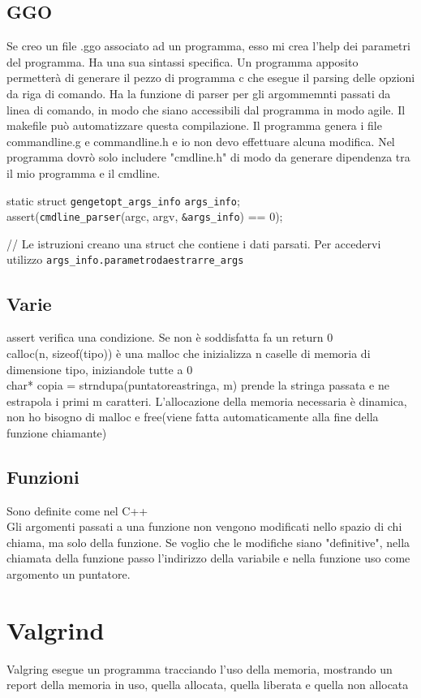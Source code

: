 \section{GGO}
Se creo un file .ggo associato ad un programma, esso mi crea l'help dei parametri del programma. Ha una sua sintassi specifica. Un programma apposito permetterà di generare il pezzo di programma c che esegue il parsing delle opzioni da riga di comando. Ha la funzione di parser per gli argommemnti passati da linea di comando, in modo che siano accessibili dal programma in modo agile.
Il makefile può automatizzare questa compilazione. Il programma genera i file commandline.g e commandline.h e io non devo effettuare alcuna modifica. Nel programma dovrò solo includere "cmdline.h" di modo da generare dipendenza tra il mio programma e il cmdline.

\begin{c}
static struct \verb|gengetopt_args_info| \verb|args_info|;\\
assert(\verb|cmdline_parser|(argc, argv, \verb|&args_info|) == 0);

// Le istruzioni creano una struct che contiene i dati parsati. Per accedervi utilizzo \verb|args_info.parametrodaestrarre_args|

\end{c}

\section{Varie}
assert verifica una condizione. Se non è soddisfatta fa un return 0\\

calloc(n, sizeof(tipo)) è una malloc che inizializza n caselle di memoria di dimensione tipo, iniziandole tutte a 0\\

char* copia = strndupa(puntatoreastringa, m) prende la stringa passata e ne estrapola i primi m caratteri. L'allocazione della memoria necessaria è dinamica, non ho bisogno di malloc e free(viene fatta automaticamente alla fine della funzione chiamante)\\

\section{Funzioni}
Sono definite come nel C++\\
Gli argomenti passati a una funzione non vengono modificati nello spazio di chi chiama, ma solo della funzione. Se voglio che le modifiche siano "definitive", nella chiamata della funzione passo l'indirizzo della variabile e nella funzione uso come argomento un puntatore.

\chapter{Valgrind}
Valgring esegue un programma tracciando l'uso della memoria, mostrando un report della memoria in uso, quella allocata, quella liberata e quella non allocata

